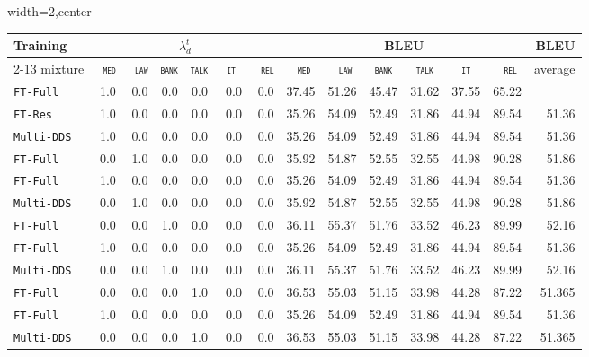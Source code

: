 \documentclass[11pt,a4paper]{article}
\newcommand{\domain}[1]{\texttt{\textsc{#1}}}
\newcommand{\system}[1]{\texttt{{#1}}}
\begin{document}
\begin{table}
  \centering%
  \begin{adjustbox}{width=2\columnwidth,center}
  \begin{tabular}{|p{2cm}|*{13}{r|}} \hline
    \multirow{2}{*}{Training} & \multicolumn{6}{|c}{$\lambda^t_d$} & \multicolumn{6}{|c|}{BLEU} & \multirow{2}{*}{BLEU} \\ \cline{2-13}	
  mixture & \multicolumn{1}{c|}{\domain{ med}} & \multicolumn{1}{c|}{\domain{ law}} & \multicolumn{1}{c|}{\domain{bank}} & \multicolumn{1}{c|}{\domain{talk}} & \multicolumn{1}{c|}{\domain{ it }} & \multicolumn{1}{c|}{\domain{ rel}} & \multicolumn{1}{c|}{\domain{ med}} & \multicolumn{1}{c|}{\domain{ law}} & \multicolumn{1}{c|}{\domain{bank}} & \multicolumn{1}{c|}{\domain{talk}} & \multicolumn{1}{c|}{\domain{ it }} & \multicolumn{1}{c|}{\domain{ rel}} & average \\
    \hline
  \system{FT-Full} & 1.0 &0.0 & 0.0 &0.0 &0.0 & 0.0 &37.45&51.26&45.47&31.62&37.55&65.22& \\
  \system{FT-Res} & 1.0 &0.0 & 0.0 &0.0 &0.0 & 0.0 &35.26 &54.09 &52.49& 31.86& 44.94& 89.54& 51.36\\
  \system{Multi-DDS} & 1.0 &0.0 & 0.0 &0.0 &0.0 & 0.0 &35.26 &54.09 &52.49& 31.86& 44.94& 89.54& 51.36\\
  \system{FT-Full} & 0.0 &1.0 & 0.0 &0.0 &0.0 & 0.0 &35.92& 54.87& 52.55& 32.55& 44.98& 90.28& 51.86\\
  \system{FT-Full} & 1.0 &0.0 & 0.0 &0.0 &0.0 & 0.0 &35.26 &54.09 &52.49& 31.86& 44.94& 89.54& 51.36\\
  \system{Multi-DDS} & 0.0 &1.0 & 0.0 &0.0 &0.0 & 0.0 &35.92& 54.87& 52.55& 32.55& 44.98& 90.28& 51.86\\
  \system{FT-Full} & 0.0 &0.0 & 1.0 &0.0 &0.0 & 0.0 &36.11& 55.37& 51.76& 33.52& 46.23& 89.99& 52.16\\
  \system{FT-Full} & 1.0 &0.0 & 0.0 &0.0 &0.0 & 0.0 &35.26 &54.09 &52.49& 31.86& 44.94& 89.54& 51.36\\
  \system{Multi-DDS} & 0.0 &0.0 & 1.0 &0.0 &0.0 & 0.0 &36.11& 55.37& 51.76& 33.52& 46.23& 89.99& 52.16\\
  \system{FT-Full} & 0.0 &0.0 & 0.0 &1.0 &0.0 & 0.0 &36.53&	55.03& 51.15& 33.98& 44.28& 87.22& 51.365\\
  \system{FT-Full} & 1.0 &0.0 & 0.0 &0.0 &0.0 & 0.0 &35.26 &54.09 &52.49& 31.86& 44.94& 89.54& 51.36\\
  \system{Multi-DDS} & 0.0 &0.0 & 0.0 &1.0 &0.0 & 0.0 &36.53&	55.03& 51.15& 33.98& 44.28& 87.22& 51.365\\

\end{tabular}
\end{adjustbox}
\end{table}
\end{document}
